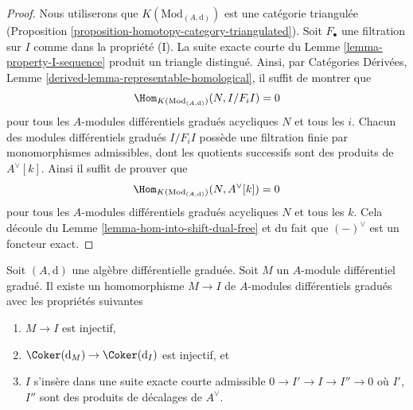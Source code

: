 \begin{proof}
Nous utiliserons que $K(\text{Mod}_{(A, \text{d})})$ est une catégorie triangulée
(Proposition \ref{proposition-homotopy-category-triangulated}). Soit $F_\bullet$
une filtration sur $I$ comme dans la propriété (I). La suite exacte courte du
Lemme \ref{lemma-property-I-sequence} produit un triangle distingué. Ainsi, par
Catégories Dérivées, Lemme \ref{derived-lemma-representable-homological}, il
suffit de montrer que
$$
\Hom_{K(\text{Mod}_{(A, \text{d})})}(N, I/F_iI) = 0
$$
pour tous les $A$-modules différentiels gradués acycliques $N$ et tous les $i$.
Chacun des modules différentiels gradués $I/F_iI$ possède une filtration finie par
monomorphismes admissibles, dont les quotients successifs sont des produits de
$A^\vee[k]$. Ainsi il suffit de prouver que
$$
\Hom_{K(\text{Mod}_{(A, \text{d})})}(N, A^\vee[k]) = 0
$$
pour tous les $A$-modules différentiels gradués acycliques $N$ et tous les $k$.
Cela découle du Lemme \ref{lemma-hom-into-shift-dual-free} et du fait que
$(-)^\vee$ est un foncteur exact.
\end{proof}

\begin{lemma}
\label{lemma-good-sub}
Soit $(A, \text{d})$ une algèbre différentielle graduée. Soit $M$ un $A$-module
différentiel gradué. Il existe un homomorphisme $M \to I$ de $A$-modules
différentiels gradués avec les propriétés suivantes
\begin{enumerate}
\item $M \to I$ est injectif,
\item $\Coker(\text{d}_M) \to \Coker(\text{d}_I)$ est injectif, et
\item $I$ s'insère dans une suite exacte courte admissible $0 \to I' \to I \to I''
\to 0$ où $I'$, $I''$ sont des produits de décalages de $A^\vee$.
\end{enumerate}
\end{lemma}

